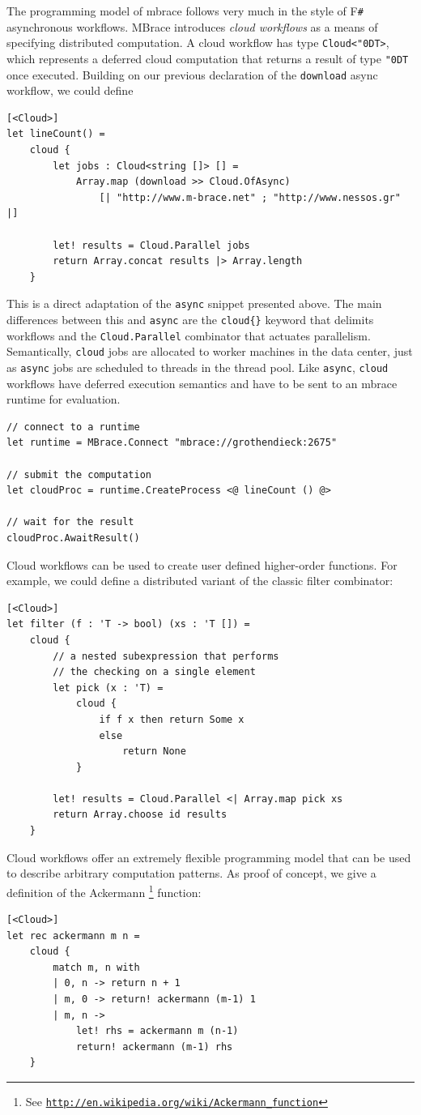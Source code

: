 \documentclass[9pt,a4paper]{article}
\newcommand{\mbrace}{mbrace}
\newcommand{\Mbrace}{MBrace}
\newcommand{\fsharp}{F\texttt \#}
\newcommand{\samehref}[1]{\href{#1}{\texttt{#1}}}
\newcommand{\uq}{\char"0D}
\begin{document}
The programming model of \mbrace{} follows very much in the style of \fsharp{} 
asynchronous workflows. \Mbrace{} introduces \emph{cloud workflows}
as a means of specifying distributed computation.
A cloud workflow has type \texttt{Cloud<\uq{}T>}, which represents a
deferred cloud computation that returns a result of type \texttt{\uq{}T} once executed.
Building on our previous declaration of the \texttt{download} async workflow, we could define
\begin{lstlisting}
[<Cloud>]
let lineCount() = 
	cloud {
    	let jobs : Cloud<string []> [] = 
        	Array.map (download >> Cloud.OfAsync) 
				[| "http://www.m-brace.net" ; "http://www.nessos.gr" |]

	    let! results = Cloud.Parallel jobs
    	return Array.concat results |> Array.length
	}
\end{lstlisting}
This is a direct adaptation of the \texttt{async} snippet presented above.
The main differences between this and \texttt{async} 
are the \texttt{cloud\{\}} keyword that delimits workflows
and the \texttt{Cloud.Parallel} combinator that actuates parallelism.
Semantically, \texttt{cloud} jobs are allocated to worker machines in the data center, 
just as \texttt{async} jobs are scheduled to threads in the thread pool. 
Like \texttt{async}, \texttt{cloud} workflows have deferred execution semantics 
and have to be sent to an \mbrace{} runtime for evaluation.
\begin{lstlisting}
// connect to a runtime
let runtime = MBrace.Connect "mbrace://grothendieck:2675"

// submit the computation
let cloudProc = runtime.CreateProcess <@ lineCount () @>

// wait for the result
cloudProc.AwaitResult()
\end{lstlisting}
%
%
Cloud workflows can be used to create user defined higher-order functions. 
For example, we could define a distributed variant of the classic filter combinator:
\begin{lstlisting}
[<Cloud>]
let filter (f : 'T -> bool) (xs : 'T []) =
    cloud {
		// a nested subexpression that performs
		// the checking on a single element
		let pick (x : 'T) =
			cloud {
				if f x then return Some x
				else
					return None
			}

        let! results = Cloud.Parallel <| Array.map pick xs
		return Array.choose id results
    }
\end{lstlisting}
%
%
Cloud workflows offer an extremely flexible programming model that can
be used to describe arbitrary computation patterns.
As proof of concept, we give a definition of the Ackermann%
\footnote{See \samehref{http://en.wikipedia.org/wiki/Ackermann\_function}} function:
\begin{lstlisting}
[<Cloud>]
let rec ackermann m n =
    cloud {
        match m, n with
        | 0, n -> return n + 1
        | m, 0 -> return! ackermann (m-1) 1
        | m, n ->
            let! rhs = ackermann m (n-1)
            return! ackermann (m-1) rhs
    }
\end{lstlisting}
%
\end{document}
